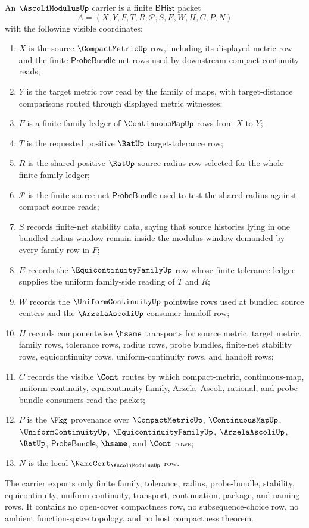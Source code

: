 \begin{definition}
\label{def:ascoli-modulus-carrier}
An $\AscoliModulusUp$ carrier is a finite $\mathsf{BHist}$ packet
$$
A=(X,Y,F,T,R,\mathcal{P},S,E,W,H,C,P,N)
$$
with the following visible coordinates:
\begin{enumerate}
\item $X$ is the source $\CompactMetricUp$ row, including its displayed metric row and the finite $\mathsf{ProbeBundle}$ net rows used by downstream compact-continuity reads;
\item $Y$ is the target metric row read by the family of maps, with target-distance comparisons routed through displayed metric witnesses;
\item $F$ is a finite family ledger of $\ContinuousMapUp$ rows from $X$ to $Y$;
\item $T$ is the requested positive $\RatUp$ target-tolerance row;
\item $R$ is the shared positive $\RatUp$ source-radius row selected for the whole finite family ledger;
\item $\mathcal{P}$ is the finite source-net $\mathsf{ProbeBundle}$ used to test the shared radius against compact source reads;
\item $S$ records finite-net stability data, saying that source histories lying in one bundled radius window remain inside the modulus window demanded by every family row in $F$;
\item $E$ records the $\EquicontinuityFamilyUp$ row whose finite tolerance ledger supplies the uniform family-side reading of $T$ and $R$;
\item $W$ records the $\UniformContinuityUp$ pointwise rows used at bundled source centers and the $\ArzelaAscoliUp$ consumer handoff row;
\item $H$ records componentwise $\hsame$ transports for source metric, target metric, family rows, tolerance rows, radius rows, probe bundles, finite-net stability rows, equicontinuity rows, uniform-continuity rows, and handoff rows;
\item $C$ records the visible $\Cont$ routes by which compact-metric, continuous-map, uniform-continuity, equicontinuity-family, Arzela--Ascoli, rational, and probe-bundle consumers read the packet;
\item $P$ is the $\Pkg$ provenance over $\CompactMetricUp$, $\ContinuousMapUp$, $\UniformContinuityUp$, $\EquicontinuityFamilyUp$, $\ArzelaAscoliUp$, $\RatUp$, $\mathsf{ProbeBundle}$, $\hsame$, and $\Cont$ rows;
\item $N$ is the local $\NameCert_{\AscoliModulusUp}$ row.
\end{enumerate}
The carrier exports only finite family, tolerance, radius, probe-bundle, stability, equicontinuity, uniform-continuity, transport, continuation, package, and naming rows. It contains no open-cover compactness row, no subsequence-choice row, no ambient function-space topology, and no host compactness theorem.
\end{definition}

